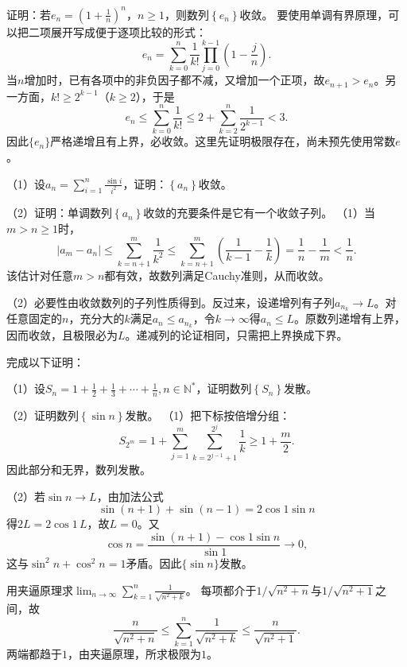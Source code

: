 证明：若\(e_{n} = {\left( 1 + \frac{1}{n} \right)}^{n}\)，\(n \ge 1\)，则数列\(\left\{ e_{n} \right\}\)收敛。
\solutionanswer
要使用单调有界原理，可以把二项展开写成便于逐项比较的形式：
\[
e_n=\sum_{k=0}^n\frac1{k!}\prod_{j=0}^{k-1}\left(1-\frac jn\right).
\]
当\(n\)增加时，已有各项中的非负因子都不减，又增加一个正项，故\(e_{n+1}>e_n\)。另一方面，\(k!\ge2^{k-1}\)（\(k\ge2\)），于是
\[
e_n\le\sum_{k=0}^n\frac1{k!}\le2+\sum_{k=2}^n\frac1{2^{k-1}}<3.
\]
因此\(\{e_n\}\)严格递增且有上界，必收敛。这里先证明极限存在，尚未预先使用常数\(e\)。


（1）设\(a_{n} = \sum _{i = 1}^{n} \frac{\sin i}{i^{2}}\)，证明：\(\left\{ a_{n} \right\}\)收敛。

    （2）证明：单调数列\(\left\{ a_{n} \right\}\)收敛的充要条件是它有一个收敛子列。
\solutionanswer
（1）当\(m>n\ge1\)时，
\[
|a_m-a_n|\le\sum_{k=n+1}^m\frac1{k^2}
\le\sum_{k=n+1}^m\left(\frac1{k-1}-\frac1k\right)
=\frac1n-\frac1m<\frac1n.
\]
该估计对任意\(m>n\)都有效，故数列满足Cauchy准则，从而收敛。

（2）必要性由收敛数列的子列性质得到。反过来，设递增列有子列\(a_{n_k}\to L\)。对任意固定的\(n\)，充分大的\(k\)满足\(a_n\le a_{n_k}\)，令\(k\to\infty\)得\(a_n\le L\)。原数列递增有上界，因而收敛，且极限必为\(L\)。递减列的论证相同，只需把上界换成下界。


完成以下证明：

    （1）设\(S_{n} = 1 + \frac{1}{2} + \frac{1}{3} + \cdots + \frac{1}{n} , n \in
    \mathbb{N}^{*}\)，证明数列\(\left\{ S_{n} \right\}\)发散。

    （2）证明数列\(\left\{ \sin n \right\}\)发散。
\solutionanswer
（1）把下标按倍增分组：
\[
S_{2^m}=1+\sum_{j=1}^m\sum_{k=2^{j-1}+1}^{2^j}\frac1k\ge1+\frac m2.
\]
因此部分和无界，数列发散。

（2）若\(\sin n\to L\)，由加法公式
\[
\sin(n+1)+\sin(n-1)=2\cos1\sin n
\]
得\(2L=2\cos1\,L\)，故\(L=0\)。又
\[
\cos n=\frac{\sin(n+1)-\cos1\sin n}{\sin1}\to0,
\]
这与\(\sin^2n+\cos^2n=1\)矛盾。因此\(\{\sin n\}\)发散。


用夹逼原理求\(\displaystyle\lim_{n\to\infty}\sum_{k=1}^{n}\frac1{\sqrt{n^2+k}}\)。
\solutionanswer
每项都介于\(1/\sqrt{n^2+n}\)与\(1/\sqrt{n^2+1}\)之间，故
\[
\frac{n}{\sqrt{n^2+n}}\le\sum_{k=1}^n\frac1{\sqrt{n^2+k}}\le\frac{n}{\sqrt{n^2+1}}.
\]
两端都趋于\(1\)，由夹逼原理，所求极限为\(1\)。


